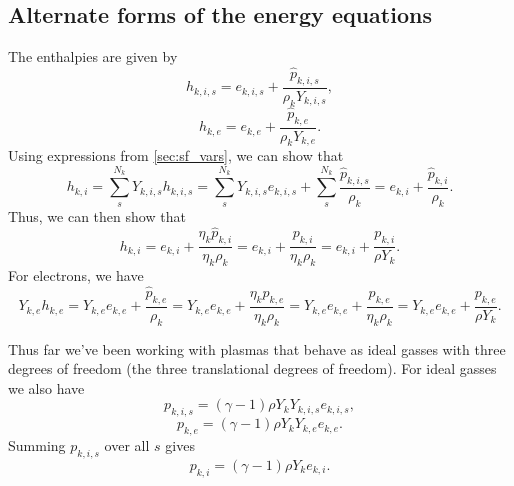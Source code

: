 \documentclass[a4paper,11pt]{report}
\begin{document}
\subsection{Alternate forms of the energy equations}

The enthalpies are given by
\begin{equation}
    h_{k,i,s} = e_{k,i,s} + \frac{\hat{p}_{k,i,s}}{\rho_k Y_{k,i,s}},
\end{equation}
 \begin{equation}   
    h_{k,e} = e_{k,e} + \frac{\hat{p}_{k,e}}{\rho_k Y_{k,e}}.
\end{equation}
Using expressions from \cref{sec:sf_vars}, we can show that
\begin{equation}
    \label{eq:sf_alternate_hki_rhok}
    h_{k,i} = \sum_s^{N_k} Y_{k,i,s} h_{k,i,s} = \sum_s^{N_k} Y_{k,i,s} e_{k,i,s} + \sum_{s}^{N_k} \frac{\hat{p}_{k,i,s}}{\rho_k} = e_{k,i} + \frac{\hat{p}_{k,i}}{\rho_k}.
\end{equation}
Thus, we can then show that
\begin{equation}
    \label{eq:sf_alternate_hki_rho}
    h_{k,i} = e_{k,i} + \frac{\eta_k \hat{p}_{k,i}}{\eta_k \rho_k} = e_{k,i} + \frac{p_{k,i}}{\eta_k \rho_k} = e_{k,i} + \frac{p_{k,i}}{\rho Y_k}.
\end{equation}
For electrons, we have
\begin{equation}
    \label{eq:sf_alternate_hke_rho}
    Y_{k,e} h_{k,e} = Y_{k,e} e_{k,e} + \frac{\hat{p}_{k,e}}{\rho_k} = Y_{k,e} e_{k,e} + \frac{\eta_k \hat{p}_{k,e}}{\eta_k \rho_k} = Y_{k,e} e_{k,e} + \frac{p_{k,e}}{\eta_k \rho_k} = Y_{k,e} e_{k,e} + \frac{p_{k,e}}{\rho Y_k }.
\end{equation}

Thus far we've been working with plasmas that behave as ideal gasses with three degrees of freedom (the three translational degrees of freedom). For ideal gasses we also have 
\begin{equation*}
    p_{k,i,s} = (\gamma - 1) \rho Y_k Y_{k,i,s} e_{k,i,s},
\end{equation*}
\begin{equation*}
    p_{k,e} = (\gamma - 1) \rho Y_k Y_{k,e} e_{k,e}.
\end{equation*}
Summing $p_{k,i,s}$ over all $s$ gives
\begin{equation}
    p_{k,i} = (\gamma - 1) \rho Y_k e_{k,i}.
\end{equation}
\end{document}

